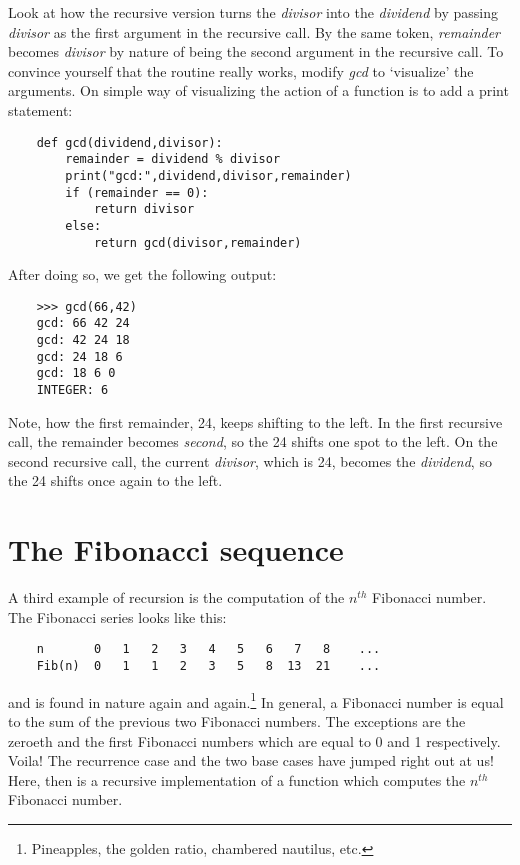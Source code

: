 Look at how the recursive version turns the {\it divisor} into 
the {\it dividend}
by passing {\it divisor} as the first argument in the recursive
call.
By the same token, {\it remainder} becomes {\it divisor} by nature
of being the second argument in the recursive call.
To convince yourself that the routine really works,
modify {\it gcd} to `visualize' the arguments. On simple
way of visualizing the action of a function is to
add a print statement:

\begin{verbatim}
    def gcd(dividend,divisor):
        remainder = dividend % divisor
        print("gcd:",dividend,divisor,remainder)
        if (remainder == 0):
            return divisor
        else:
            return gcd(divisor,remainder)
\end{verbatim}

After doing so, we get the following output:

\begin{verbatim}
    >>> gcd(66,42)
    gcd: 66 42 24
    gcd: 42 24 18
    gcd: 24 18 6
    gcd: 18 6 0
    INTEGER: 6
\end{verbatim}

Note, how the first remainder, 24, keeps shifting
to the left.
In the first recursive call, the remainder becomes 
{\it second}, so the 24 shifts one spot to the left. On
the second recursive call, the current {\it divisor},
which is 24,
becomes the {\it dividend},
so the 24 shifts once again to
the left.

\section{The Fibonacci sequence}

A third example of recursion is the computation of the
$n^{th}$ Fibonacci number.
The Fibonacci series looks like this:
 
\begin{verbatim}
    n       0   1   2   3   4   5   6   7   8    ...
    Fib(n)  0   1   1   2   3   5   8  13  21    ...
\end{verbatim}

and is found in nature again and again.\footnote{
Pineapples, the golden ratio, chambered nautilus, etc.
}
In general, a Fibonacci number is equal to the sum of the previous
two Fibonacci numbers. The exceptions are the zeroeth and the first
Fibonacci numbers which are equal to 0 and 1 respectively. Voila! The
recurrence case and the two base cases have jumped right out at us! Here,
then is a recursive implementation of a function which computes the $n^{th}$
Fibonacci number.

